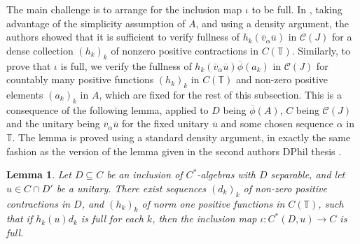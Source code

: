 \documentclass[reqno]{amsart}
\newtheorem{lem}[thm]{Lemma}
\theoremstyle{definition}
\theoremstyle{remark}
\numberwithin{equation}{section}
\theoremstyle{definition}
\newcommand{\calC}{\mathcal{C}}
\begin{document}
The main challenge is to arrange for the inclusion map $\iota$ to be full. In \cite{K1-injective}, taking advantage of the simplicity assumption of $A$, and using a density argument, the authors showed that it is sufficient to verify fullness of $h_{k}(\overline{v}_{\alpha}\overline{u})$ in $\calC(J)$ for a dense collection $(h_k)_k$ of nonzero positive contractions in $C(\mathbb{T})$. Similarly, to prove that $\iota$ is full, we verify the fullness of $h_k(\overline{v}_\alpha \overline{u})\overline{\phi}(a_k)$ in $\calC(J)$ for countably many positive functions $(h_{k})_{k}$ in $C(\mathbb{T})$ and non-zero positive elements $(a_{k})_{k}$ in $A$, which are fixed for the rest of this subsection. This is a consequence of the following lemma, applied to $D$ being $\overline{\phi}(A)$, $C$ being $\calC(J)$ and the unitary being $\overline{v}_{\alpha} \overline{u}$ for the fixed unitary $\overline{u}$ and some chosen sequence $\alpha$ in $\mathbb{T}$. The lemma is proved using a standard density argument, in exactly the same fashion as the version of the lemma given in the second authors DPhil thesis \cite[Lemma 6.2.7]{Hua_thesis}.

\begin{lem} \label{reduce-countable} 
Let $D\subseteq C$ be an inclusion of $C^*$-algebras with $D$ separable, and let $u\in C\cap D'$ be a unitary.  There exist sequences $(d_k)_k$ of non-zero positive contractions in $D$, and $(h_k)_k$ of norm one positive functions in $C(\mathbb T)$, such that if $h_k(u)d_k$ is full for each $k$, then the inclusion map $\iota\colon C^*(D,u)\to C$ is full.
\end{lem} 
\end{document}
